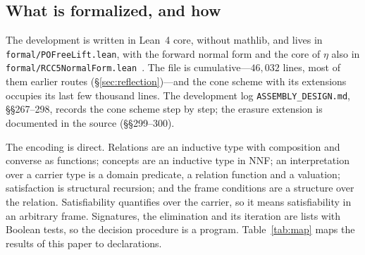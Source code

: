 \documentclass[11pt]{article}
\theoremstyle{plain}
\theoremstyle{definition}
\begin{document}
\subsection{What is formalized, and how}

The development is written in Lean~4 core, without mathlib, and lives in
\texttt{formal/POFreeLift.lean}, with the forward normal form and the core of
$\eta$ also in \texttt{formal/RCC5NormalForm.lean}~\cite{Artifact}. The file is
cumulative---$46{,}032$ lines, most of them earlier routes
(\S\ref{sec:reflection})---and the cone scheme with its extensions occupies its
last few thousand lines. The development log \texttt{ASSEMBLY\_DESIGN.md},
\S\S267--298, records the cone scheme step by step; the erasure extension is
documented in the source (\S\S299--300).

The encoding is direct. Relations are an inductive type with composition and
converse as functions; concepts are an inductive type in NNF; an interpretation
over a carrier type is a domain predicate, a relation function and a valuation;
satisfaction is structural recursion; and the frame conditions are a structure
over the relation. Satisfiability quantifies over the carrier, so it means
satisfiability in an arbitrary frame. Signatures, the elimination and its
iteration are lists with Boolean tests, so the decision procedure is a program.
Table~\ref{tab:map} maps the results of this paper to declarations.
\end{document}
